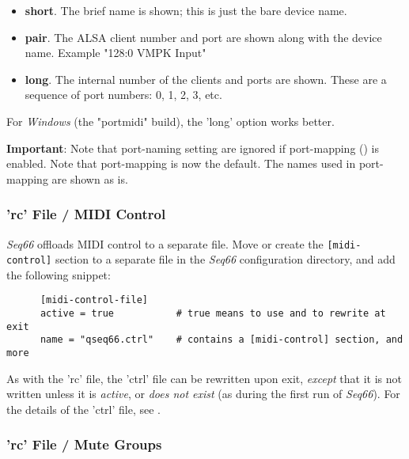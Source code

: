    \begin{itemize}
      \item \textbf{short}.
         The brief name is shown; this is just the bare device name.
      \item \textbf{pair}.
         The ALSA client number and port are shown along with the device name.
         Example "128:0 VMPK Input"
      \item \textbf{long}.
         The internal number of the clients and ports are shown.
         These are a sequence of port numbers: 0, 1, 2, 3, etc.
   \end{itemize}

   For \textsl{Windows} (the "portmidi" build),
   the 'long' option works better.

   \textbf{Important}: Note that port-naming setting are ignored if
   port-mapping () is enabled. Note that
   port-mapping is now the default.
   The names used in port-mapping are shown as is.

\subsubsection{'rc' File / MIDI Control}
\label{subsubsec:configuration_rc_midi_control}

   \textsl{Seq66} offloads MIDI control to a separate file.
   Move or create
   the \texttt{[midi-control]} section to a separate file in
   the \textsl{Seq66} configuration directory, and add the following
   snippet:

   \begin{verbatim}
      [midi-control-file]
      active = true           # true means to use and to rewrite at exit
      name = "qseq66.ctrl"    # contains a [midi-control] section, and more
   \end{verbatim}

   As with the 'rc' file, the 'ctrl' file can be rewritten upon exit,
   \textsl{except} that it is not written unless it is \textsl{active},
   or \textsl{does not exist} (as during the first run of \textsl{Seq66}).
   For the details of the 'ctrl' file, see
   .

\subsubsection{'rc' File / Mute Groups}
\label{subsubsec:configuration_rc_mute_groups}

